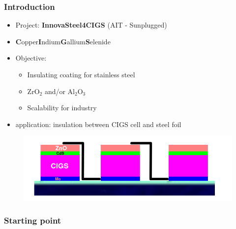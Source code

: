 \documentclass{beamer}
\newcommand{\bb}[1]{\textbf{#1}}
\newcommand{\me}[1]{\textcolor{gray}{#1}}
\begin{document}
\begin{frame}
	\frametitle{Introduction}
	\begin{itemize}
		\item Project: \textbf{InnovaSteel4CIGS} (AIT - Sunplugged)
		\item \bb{C}opper\bb{I}ndium\bb{G}allium\bb{S}elenide
		\item Objective: 
			\begin{itemize}
				\item Insulating coating for stainless steel
				\item ZrO$_2$ and/or Al$_2$O$_3$
				\item Scalability for industry
			\end{itemize}
		\item application: insulation between CIGS cell and steel foil

	\end{itemize}
	\begin{figure}
		\includegraphics[width=\textwidth]{Images/cigs_mod.png}
	\end{figure}
\end{frame}

\begin{frame}
	\frametitle{Starting point}
\end{frame}
\end{document}
